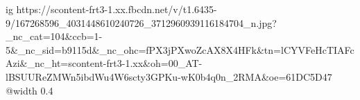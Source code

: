  
 
 
 
 

\ifcmt
  ig https://scontent-frt3-1.xx.fbcdn.net/v/t1.6435-9/167268596_4031448610240726_3712960939116184704_n.jpg?_nc_cat=104&ccb=1-5&_nc_sid=b9115d&_nc_ohc=fPX3jPXwoZcAX8X4HFk&tn=lCYVFeHcTIAFcAzi&_nc_ht=scontent-frt3-1.xx&oh=00_AT-lBSUUReZMWn5ibdWu4W6scty3GPKu-wK0b4q0n_2RMA&oe=61DC5D47
  @width 0.4
\fi
